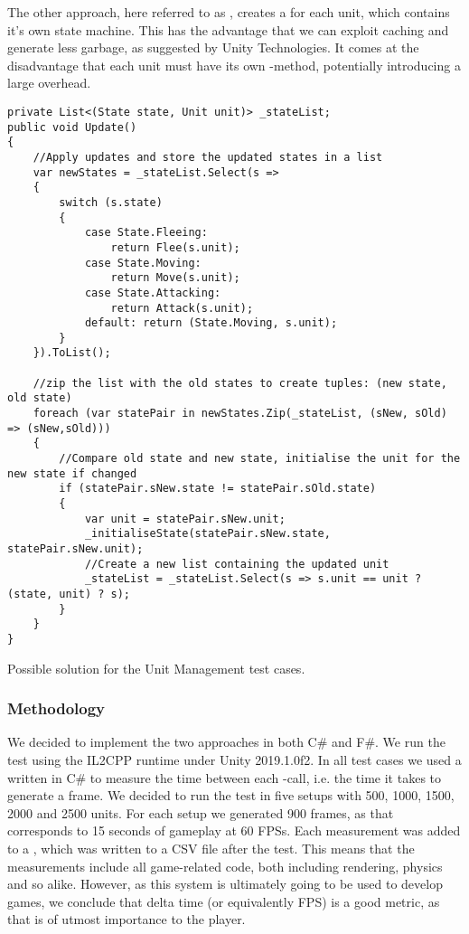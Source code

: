The other approach, here referred to as , creates a  for each unit, which contains it's own state machine. This has the advantage that we can exploit caching and generate less garbage, as suggested by Unity Technologies\cite{unity:optimisation}. It comes at the disadvantage that each unit must have its own -method, potentially introducing a large overhead\cite{unity:runtime:calls}.

\begin{listing}
\begin{verbatim}
private List<(State state, Unit unit)> _stateList;
public void Update()
{
    //Apply updates and store the updated states in a list
    var newStates = _stateList.Select(s =>
    {
        switch (s.state)
        {
            case State.Fleeing:
                return Flee(s.unit);
            case State.Moving:
                return Move(s.unit);
            case State.Attacking:
                return Attack(s.unit);
            default: return (State.Moving, s.unit);
        }
    }).ToList();

    //zip the list with the old states to create tuples: (new state, old state)
    foreach (var statePair in newStates.Zip(_stateList, (sNew, sOld) => (sNew,sOld)))
    {
        //Compare old state and new state, initialise the unit for the new state if changed
        if (statePair.sNew.state != statePair.sOld.state)
        {
            var unit = statePair.sNew.unit;
            _initialiseState(statePair.sNew.state, statePair.sNew.unit);
            //Create a new list containing the updated unit
            _stateList = _stateList.Select(s => s.unit == unit ? (state, unit) ? s);
        }
    }
}
\end{verbatim}
\caption{Possible solution for the Unit Management test cases.}
\label{lst:test:case:ai}
\end{listing}

\subsubsection{Methodology}
We decided to implement the two approaches in both C\# and F\#. We run the test using the IL2CPP runtime under Unity 2019.1.0f2. In all test cases we used a  written in C\# to measure the time between each -call, i.e. the time it takes to generate a frame. We decided to run the test in five setups with 500, 1000, 1500, 2000 and 2500 units. For each setup we generated 900 frames, as that corresponds to 15 seconds of gameplay at 60 \glspl{FPS}. Each measurement was added to a , which was written to a CSV file after the test. This means that the measurements include all game-related code, both including rendering, physics and so alike. However, as this system is ultimately going to be used to develop games, we conclude that delta time (or equivalently \gls{FPS}) is a good metric, as that is of utmost importance to the player.

